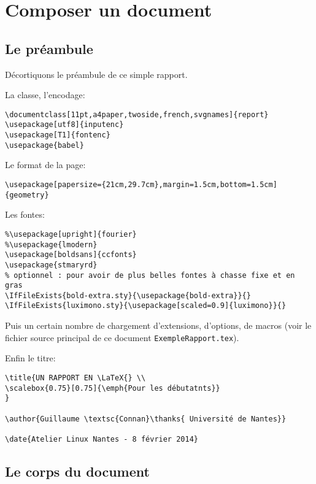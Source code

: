 \chapter{Composer un document}


\section{Le préambule}

Décortiquons le préambule de ce simple rapport.

\lat

La classe, l'encodage:

\begin{lstlisting}
\documentclass[11pt,a4paper,twoside,french,svgnames]{report}
\usepackage[utf8]{inputenc}
\usepackage[T1]{fontenc}
\usepackage{babel}
\end{lstlisting}

Le format de la page:

\begin{lstlisting}
\usepackage[papersize={21cm,29.7cm},margin=1.5cm,bottom=1.5cm]{geometry}
\end{lstlisting}

Les fontes:

\begin{lstlisting}
%\usepackage[upright]{fourier}
%\usepackage{lmodern}
\usepackage[boldsans]{ccfonts}
\usepackage{stmaryrd}
% optionnel : pour avoir de plus belles fontes à chasse fixe et en gras
\IfFileExists{bold-extra.sty}{\usepackage{bold-extra}}{}
\IfFileExists{luximono.sty}{\usepackage[scaled=0.9]{luximono}}{}
\end{lstlisting}


Puis un certain nombre de chargement d'extensions, d'options, de macros (voir le
fichier source principal de ce document \verb+ExempleRapport.tex+).

Enfin le titre:

\begin{lstlisting}
\title{UN RAPPORT EN \LaTeX{} \\
\scalebox{0.75}[0.75]{\emph{Pour les débutatnts}}
}

\author{Guillaume \textsc{Connan}\thanks{ Université de Nantes}}

\date{Atelier Linux Nantes - 8 février 2014}
\end{lstlisting}


\section{Le corps du document}

